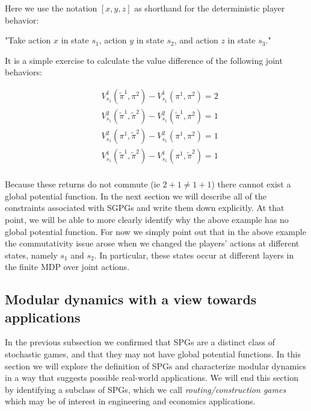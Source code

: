 \begin{eg}
Here we use the notation $\left[x, y, z \right]$ as shorthand for the deterministic player behavior:

\begin{center}
"Take action $x$ in state $s_1$, action $y$ in state $s_2$, and action $z$ in state $s_3$."
\end{center}

It is a simple exercise to calculate the value difference of the following joint behaviors:

\begin{align*}
&V^1_{s_1}(\tilde{\pi}^1, \pi^2) - V^1_{s_1}(\pi^1, \pi^2) = 2 \\
&V^2_{s_1}(\tilde{\pi}^1, \tilde{\pi}^2) - V^2_{s_1}(\tilde{\pi}^1, \pi^2) = 1 \\
&V^2_{s_1}(\pi^1, \tilde{\pi}^2) - V^2_{s_1}(\pi^1, \pi^2) = 1 \\
&V^1_{s_1}(\tilde{\pi}^1, \tilde{\pi}^2) - V^1_{s_1}(\pi^1, \tilde{\pi}^2) = 1 \\
\end{align*}

Because these returns do not commute (ie $2+1 \neq 1+1$) there cannot exist a global potential function. In the next section we will describe all of the constraints associated with SGPGs and write them down explicitly. At that point, we will be able to more clearly identify why the above example has no global potential function. For now we simply point out that in the above example the commutativity issue arose when we changed the players' actions at different states, namely $s_1$ and $s_2$. In particular, these states occur at different layers in the finite MDP over joint actions.

\label{eg:spgnotsgpg}
\end{eg}


\subsection{Modular dynamics with a view towards applications}

In the previous subsection we confirmed that SPGs are a distinct class of stochastic games, and that they may not have global potential functions. In this section we will explore the definition of SPGs and characterize modular dynamics in a way that suggests possible real-world applications. We will end this section by identifying a subclass of SPGs, which we call {\em routing/construction games} which may be of interest in engineering and economics applications.

